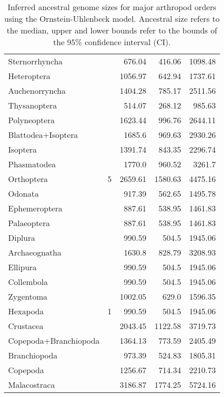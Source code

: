 \begin{table}[h!]
\begin{tabular}{lrrrr}
Sternorrhyncha &  & 676.04 & 416.06 & 1098.48 \\
Heteroptera &  & 1056.97 & 642.94 & 1737.61 \\
Auchenorryncha &  & 1404.28 & 785.17 & 2511.56 \\
Thysanoptera &  & 514.07 & 268.12 & 985.63 \\
Polyneoptera &  & 1623.44 & 996.76 & 2644.11 \\
Blattodea+Isoptera &  & 1685.6 & 969.63 & 2930.26 \\
Isoptera &  & 1391.74 & 843.35 & 2296.74 \\
Phasmatodea &  & 1770.0 & 960.52 & 3261.7 \\
Orthoptera & 5 & 2659.61 & 1580.63 & 4475.16 \\
Odonata &  & 917.39 & 562.65 & 1495.78 \\
Ephemeroptera &  & 887.61 & 538.95 & 1461.83 \\
Palaeoptera &  & 887.61 & 538.95 & 1461.83 \\
Diplura &  & 990.59 & 504.5 & 1945.06 \\
Archaeognatha &  & 1630.8 & 828.79 & 3208.93 \\
Ellipura &  & 990.59 & 504.5 & 1945.06 \\
Collembola &  & 990.59 & 504.5 & 1945.06 \\
Zygentoma &  & 1002.05 & 629.0 & 1596.35 \\
Hexapoda & 1 & 990.59 & 504.5 & 1945.06 \\
Crustacea &  & 2043.45 & 1122.58 & 3719.73 \\
Copepoda+Branchiopoda &  & 1364.13 & 773.59 & 2405.49 \\
Branchiopoda &  & 973.39 & 524.83 & 1805.31 \\
Copepoda &  & 1256.67 & 714.34 & 2210.73 \\
Malacostraca &  & 3186.87 & 1774.25 & 5724.16 \\
\end{tabular}
\caption{{Inferred ancestral genome sizes for major arthropod orders using the
Ornstein-Uhlenbeck model. Ancestral size refers to the median, upper and
lower bounds refer to the bounds of the 95\% confidence interval (CI).
{\label{984909}}%
}}
\end{table}

